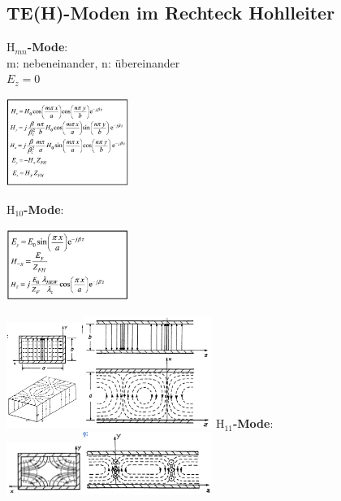 \documentclass[english]{latex4ei/latex4ei_sheet}
\begin{document}
\begin{sectionbox}
    \subsection{TE(H)-Moden im Rechteck Hohlleiter}
    \textbf{$\text{H}_{mn}$-Mode}:\\
    m: nebeneinander, n: übereinander\\
    $E_z = 0$
    \begin{center}\includegraphics[width = 4cm]{./img/Hmn.png}\end{center}


    \textbf{$\text{H}_{10}$-Mode}:
    \begin{center}\includegraphics[width = 4cm]{./img/H10.png}\end{center}
    \includegraphics[width = 2.5cm]{./img/H10-comb.jpeg}\includegraphics[width = 4.2cm]{./img/H10-bild2.png}
    \textbf{$\text{H}_{11}$-Mode}:\\
    \includegraphics[width = 2.5cm]{./img/H11-bild1.png}\includegraphics[width = 4.2cm]{./img/H11-bild2.png}
\end{sectionbox}
\end{document}
